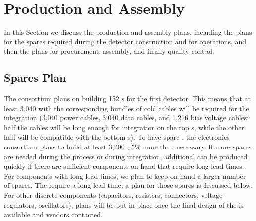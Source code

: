\section{Production and Assembly}
\label{sec:fdsp-tpcelec-production}

In this Section we discuss the production and assembly plans,
including the plans for the spares required during the detector
construction and for operations, and then the plans for
procurement, assembly, and finally quality control.


\subsection{Spares Plan}
\label{sec:fdsp-tpcelec-production-spares}

The  consortium plans on building 152 s
for the first  detector. This means that at least
3,040  with the corresponding bundles of cold
cables will be required for the integration (3,040 power cables, 3,040 data cables,
and 1,216 bias voltage cables; half the cables will be long enough for 
integration on the top s, while the other half will
be compatible with the bottom s). To have spare , the  electronics consortium plans to
build at least 3,200 , 5\% more than necessary. If more spares are needed during the
 process or during integration, additional 
 can be produced quickly if there are sufficient components on hand
that require long lead times. For components with long lead times, we plan to keep on hand a
larger number of spares. The  require a long lead time; a plan for those spares is
discussed below. For other discrete components
(capacitors, resistors, connectors, voltage regulators, oscillators),
plans will be put in place once the final design of the 
is available and vendors contacted. %

